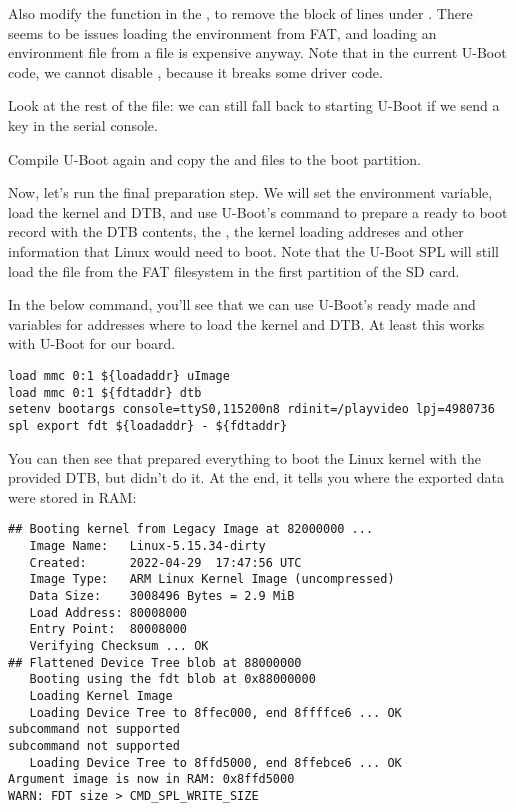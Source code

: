 Also modify the  function in the
, to remove the block
of lines under . There seems to be
issues loading the environment from FAT, and loading an environment file
from a file is expensive anyway. Note that in the current U-Boot code,
we cannot disable , because
it breaks some driver code.

Look at the rest of the  file:
we can still fall back to starting U-Boot if we send a  key
in the serial console.

Compile U-Boot again and copy the  and 
files to the boot partition.

Now, let's run the final preparation step. We will set the
 environment variable, load the kernel and DTB, and
use U-Boot's  command to prepare a ready to boot record
with the DTB contents, the , the kernel loading addreses
and other information that Linux would need to boot. Note that the
U-Boot SPL will still load the  file from the FAT
filesystem in the first partition of the SD card.

In the below command, you'll see that we can use U-Boot's ready made
 and  variables for addresses where to load
the kernel and DTB. At least this works with U-Boot for our board.

\begin{verbatim}
load mmc 0:1 ${loadaddr} uImage
load mmc 0:1 ${fdtaddr} dtb
setenv bootargs console=ttyS0,115200n8 rdinit=/playvideo lpj=4980736
spl export fdt ${loadaddr} - ${fdtaddr}
\end{verbatim}

You can then see that  prepared everything to boot the
Linux kernel with the provided DTB, but didn't do it. At the end, it
tells you where the exported data were stored in RAM:

\begin{verbatim}
## Booting kernel from Legacy Image at 82000000 ...
   Image Name:   Linux-5.15.34-dirty
   Created:      2022-04-29  17:47:56 UTC
   Image Type:   ARM Linux Kernel Image (uncompressed)
   Data Size:    3008496 Bytes = 2.9 MiB
   Load Address: 80008000
   Entry Point:  80008000
   Verifying Checksum ... OK
## Flattened Device Tree blob at 88000000
   Booting using the fdt blob at 0x88000000
   Loading Kernel Image
   Loading Device Tree to 8ffec000, end 8ffffce6 ... OK
subcommand not supported
subcommand not supported
   Loading Device Tree to 8ffd5000, end 8ffebce6 ... OK
Argument image is now in RAM: 0x8ffd5000
WARN: FDT size > CMD_SPL_WRITE_SIZE
\end{verbatim}

